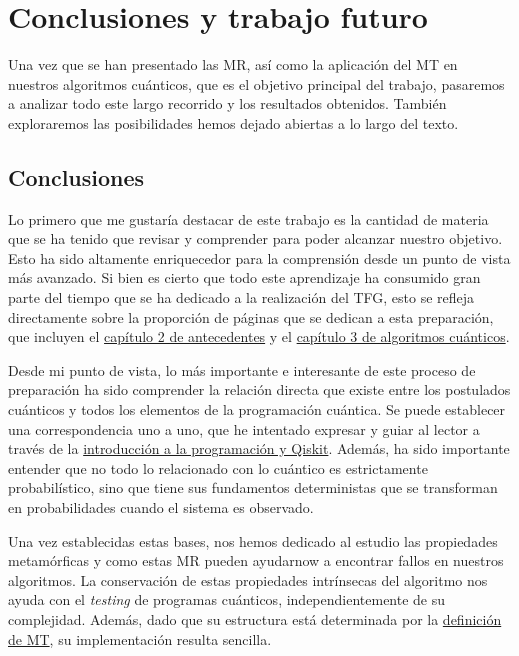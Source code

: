 \cleardoublepage

\chapter{Conclusiones y trabajo futuro}
\label{Cap5:Conclusion}
 Una vez que se han presentado las MR, así como la aplicación del MT en nuestros algoritmos cuánticos, que es el objetivo principal del trabajo, pasaremos a analizar todo este largo recorrido y los resultados obtenidos. También exploraremos las posibilidades hemos dejado abiertas a lo largo del texto.

 
\section{Conclusiones}
\label{Sec5.1:Conclusion}

Lo primero que me gustaría destacar de este trabajo es la cantidad de materia que se ha tenido que revisar y comprender para poder alcanzar nuestro objetivo. Esto ha sido altamente enriquecedor para la comprensión desde un punto de vista más avanzado. Si bien es cierto que todo este aprendizaje ha consumido gran parte del tiempo que se ha dedicado a la realización del TFG, esto se refleja directamente sobre la proporción de páginas que se dedican a esta preparación, que incluyen el  \hyperref[Cap2:Antecedentes]{capítulo 2 de antecedentes} y el \hyperref[Cap3:Algoritmos]{capítulo 3 de algoritmos cuánticos}.\newline

Desde mi punto de vista, lo más importante e interesante de este proceso de preparación ha sido comprender la relación directa que existe entre los postulados cuánticos y todos los elementos de la programación cuántica. Se puede establecer una correspondencia uno a uno, que he intentado expresar y guiar al lector a través de la \hyperref[Sec2.3:Qiskit]{introducción a la programación y Qiskit}.  Además, ha sido importante entender que no todo lo relacionado con lo cuántico es estrictamente probabilístico, sino que tiene sus fundamentos deterministas que se transforman en probabilidades cuando el sistema es observado. \newline

Una vez establecidas estas bases, nos hemos dedicado al estudio las propiedades metamórficas y como estas MR pueden ayudarnow a encontrar fallos en nuestros algoritmos. La conservación de estas propiedades intrínsecas del algoritmo nos ayuda con el \textit{testing} de programas cuánticos, independientemente de su complejidad. Además, dado que su estructura está determinada por la \hyperref[Def:MT]{definición de MT}, su implementación resulta sencilla.\newline

